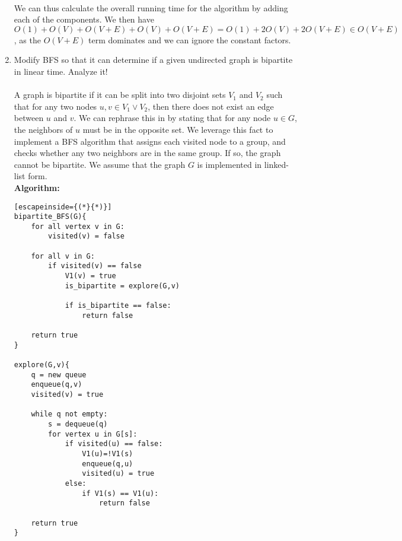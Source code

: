 \documentclass{article}
\begin{document}
\begin{enumerate}
\\ We can thus calculate the overall running time for the algorithm by adding each of the components. We then have $O(1)+O(V)+O(V+E)+O(V)+O(V+E)=O(1)+2O(V)+2O(V+E)\in O(V+E)$, as the $O(V+E)$ term dominates and we can ignore the constant factors.
\item Modify BFS so that it can determine if a given undirected graph is bipartite in linear time. Analyze it!
\\\\ A graph is bipartite if it can be split into two disjoint sets $V_1$ and $V_2$ such that for any two nodes $u,v \in  V_1 \lor V_2$, then there does not exist an edge between $u$ and $v$. We can rephrase this in by stating that for any node $u \in G$, the neighbors of $u$ must be in the opposite set. We leverage this fact to implement a BFS algorithm that assigns each visited node to a group, and checks whether any two neighbors are in the same group. If so, the graph cannot be bipartite. We assume that the graph $G$ is implemented in linked-list form.
\\ \textbf{Algorithm:}
\begin{lstlisting}[escapeinside={(*}{*)}]
bipartite_BFS(G){
	for all vertex v in G:
		visited(v) = false
		
	for all v in G:
		if visited(v) == false
			V1(v) = true
			is_bipartite = explore(G,v)
			
			if is_bipartite == false:
				return false
				
	return true
}

explore(G,v){
	q = new queue
	enqueue(q,v)
	visited(v) = true
	
	while q not empty:
		s = dequeue(q)
		for vertex u in G[s]:
			if visited(u) == false:
				V1(u)=!V1(s)
				enqueue(q,u)
				visited(u) = true
			else:
				if V1(s) == V1(u):
					return false
	
	return true
}


\end{lstlisting}
\end{enumerate}
\end{document}
